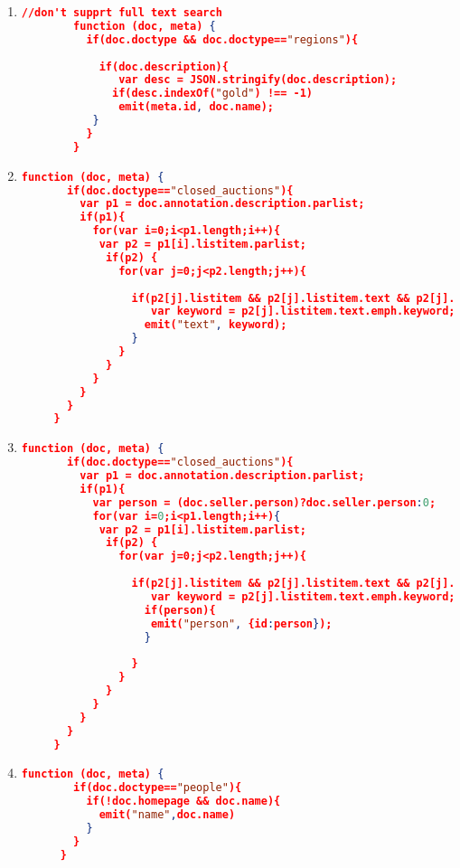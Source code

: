 \begin{enumerate}[label=Q\arabic*.]
\begin{lstlisting}[language=JSON]
	       }
	     }
	   }
	\end{lstlisting}
	
    \item %
	\begin{lstlisting}[language=JSON]
		//don't supprt full text search
	 	function (doc, meta) {
	 	  if(doc.doctype && doc.doctype=="regions"){
	 	   
	 	    if(doc.description){
	 	       var desc = JSON.stringify(doc.description);
	 	      if(desc.indexOf("gold") !== -1)
	 	       emit(meta.id, doc.name);
	 	   }
	 	  }
	 	}
	\end{lstlisting}	

    \item %
	\begin{lstlisting}[language=JSON]
	 function (doc, meta) {
	   if(doc.doctype=="closed_auctions"){
	     var p1 = doc.annotation.description.parlist;
	     if(p1){
	       for(var i=0;i<p1.length;i++){
	       	var p2 = p1[i].listitem.parlist;
	         if(p2) {
	           for(var j=0;j<p2.length;j++){
	             
	             if(p2[j].listitem && p2[j].listitem.text && p2[j].listitem.text.emph && p2[j].listitem.text.emph.keyword){
	             	var keyword = p2[j].listitem.text.emph.keyword;
	               emit("text", keyword);   
	             }
	           }
	         }
	       }
	     }
	   }
	 }
	\end{lstlisting}	

    \item %
	\begin{lstlisting}[language=JSON]
	 function (doc, meta) {
	   if(doc.doctype=="closed_auctions"){
	     var p1 = doc.annotation.description.parlist;
	     if(p1){
	       var person = (doc.seller.person)?doc.seller.person:0;
	       for(var i=0;i<p1.length;i++){
	       	var p2 = p1[i].listitem.parlist;
	         if(p2) {
	           for(var j=0;j<p2.length;j++){
	             
	             if(p2[j].listitem && p2[j].listitem.text && p2[j].listitem.text.emph && p2[j].listitem.text.emph.keyword){
	             	var keyword = p2[j].listitem.text.emph.keyword;
	               if(person){
	               	emit("person", {id:person});     
	               }
	               
	             }
	           }
	         }
	       }
	     }
	   }
	 }
	\end{lstlisting}	

    
    \item %
	\begin{lstlisting}[language=JSON]
	  function (doc, meta) {
	    if(doc.doctype=="people"){
	      if(!doc.homepage && doc.name){
	        emit("name",doc.name)
	      } 
	    }
	  }
	\end{lstlisting}	


\end{enumerate}
